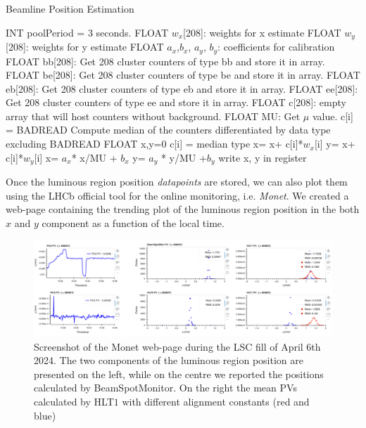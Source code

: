 \begin{algorithm}
\caption{Beamline Position Estimation}\label{alg:beamline}
\begin{algorithmic}[1]
\ENSURE  INT poolPeriod = 3 seconds.
\ENSURE  FLOAT $w_x$[208]: weights for x estimate
\ENSURE  FLOAT $w_y$[208]: weights for y estimate
\ENSURE  FLOAT $a_x$,$ b_x$, $a_y$, $b_y$: coefficients for calibration 
        \STATE FLOAT  bb[208]: Get 208 cluster counters of type bb and store it in array.
        \STATE FLOAT  be[208]: Get 208 cluster counters of type be and store it in array.
        \STATE FLOAT  eb[208]: Get 208 cluster counters of type eb and store it in array.
        \STATE FLOAT  ee[208]: Get 208 cluster counters of type ee and store it in array.
        \STATE FLOAT c[208]: empty array that will host counters without background.
        \STATE FLOAT MU: Get $\mu$ value.
        \ELSE
        \STATE c[i] = BADREAD
        \ENDIF
        \ENDFOR
        \STATE Compute median of the counters differentiated by data type excluding BADREAD 
        \STATE FLOAT x,y=0
            \STATE c[i] = median type 
        \ENDIF
        \STATE x= x+ c[i]*$w_x$[i]
        \STATE y= x+ c[i]*$w_y$[i]
        \ENDFOR
        \STATE x= $a_x$* x/MU + $b_x$
        \STATE y= $a_y$ * y/MU +$b_y$
        \STATE write x, y in register
        \ENDIF
    \ENDIF
\ENDWHILE
\end{algorithmic}
\end{algorithm}


Once the luminous region position \textit{datapoints} are stored, we can also plot them using the LHCb official tool for the online monitoring, i.e. \textit{Monet}. We created a web-page containing the trending plot of the luminous region position in the both $x$ and $y$ component as a function of the local time.

\begin{figure}
    \centering
    \includegraphics[width=\textwidth]{figures/Monet_beamline_screen.png}
    \caption{Screenshot of the Monet web-page during the LSC fill of April 6th 2024. The two components of the luminous region position are presented on the left, while on the centre we reported the positions calculated by BeamSpotMonitor. On the right the mean PVs calculated by HLT$1$ with different alignment constants (red and blue)}
    \label{fig:monet_beamline}
\end{figure}

